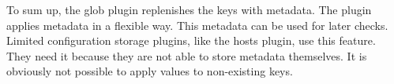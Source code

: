 To sum up, the glob plugin replenishes the keys with metadata. The plugin applies metadata in a flexible way. This metadata can be used for later checks. Limited configuration storage plugins, like the {\ttfamily hosts} plugin, use this feature. They need it because they are not able to store metadata themselves. It is obviously not possible to apply values to non-\/existing keys. 